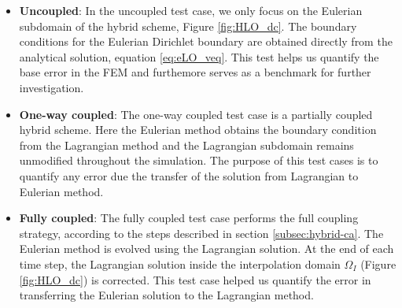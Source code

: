 \begin{itemize}
\item \textbf{Uncoupled}: In the uncoupled test case, we only focus on the Eulerian subdomain of the hybrid scheme, Figure \ref{fig:HLO_dc}. The boundary conditions for the Eulerian Dirichlet boundary are obtained directly from the analytical solution, equation \ref{eq:eLO_veq}. This test helps us quantify the base error in the FEM and furthemore serves as a benchmark for further investigation.
\item \textbf{One-way coupled}: The one-way coupled test case is a partially coupled hybrid scheme. Here the Eulerian method obtains the boundary condition from the Lagrangian method and the Lagrangian subdomain remains unmodified throughout the simulation. The purpose of this test cases is to quantify any error due the transfer of the solution from Lagrangian to Eulerian method.
\item \textbf{Fully coupled}: The fully coupled test case performs the full coupling strategy, according to the steps described in section \ref{subsec:hybrid-ca}. The Eulerian method is evolved using the Lagrangian solution. At the end of each time step, the Lagrangian solution inside the interpolation domain $\Omega_{I}$ (Figure \ref{fig:HLO_dc}) is corrected. This test case helped us quantify the error in transferring the Eulerian solution to the Lagrangian method.
\end{itemize}
	

